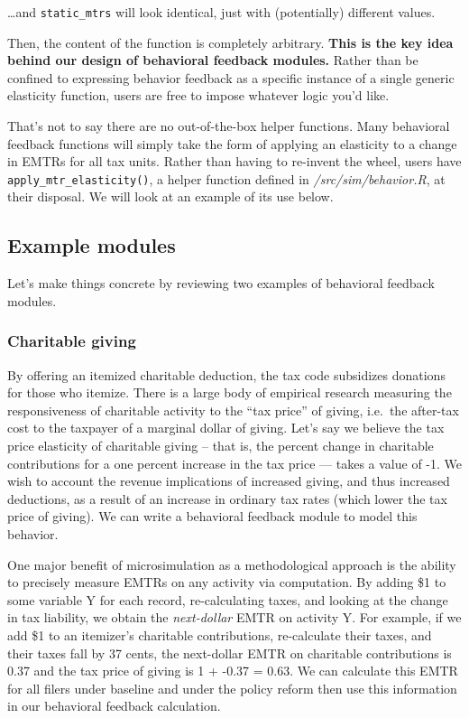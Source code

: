 \documentclass[
]{article}
\begin{document}
\ldots and \texttt{static\_mtrs} will look identical, just with
(potentially) different values.

Then, the content of the function is completely arbitrary. \textbf{This
is the key idea behind our design of behavioral feedback modules.}
Rather than be confined to expressing behavior feedback as a specific
instance of a single generic elasticity function, users are free to
impose whatever logic you'd like.

That's not to say there are no out-of-the-box helper functions. Many
behavioral feedback functions will simply take the form of applying an
elasticity to a change in EMTRs for all tax units. Rather than having to
re-invent the wheel, users have \texttt{apply\_mtr\_elasticity()}, a
helper function defined in \emph{/src/sim/behavior.R}, at their
disposal. We will look at an example of its use below.

\hypertarget{example-modules}{%
\subsection{Example modules}\label{example-modules}}

Let's make things concrete by reviewing two examples of behavioral
feedback modules.

\hypertarget{charitable-giving}{%
\subsubsection{Charitable giving}\label{charitable-giving}}

By offering an itemized charitable deduction, the tax code subsidizes
donations for those who itemize. There is a large body of empirical
research measuring the responsiveness of charitable activity to the
``tax price'' of giving, i.e.~the after-tax cost to the taxpayer of a
marginal dollar of giving. Let's say we believe the tax price elasticity
of charitable giving -- that is, the percent change in charitable
contributions for a one percent increase in the tax price --- takes a
value of -1. We wish to account the revenue implications of increased
giving, and thus increased deductions, as a result of an increase in
ordinary tax rates (which lower the tax price of giving). We can write a
behavioral feedback module to model this behavior.

One major benefit of microsimulation as a methodological approach is the
ability to precisely measure EMTRs on any activity via computation. By
adding \$1 to some variable Y for each record, re-calculating taxes, and
looking at the change in tax liability, we obtain the \emph{next-dollar}
EMTR on activity Y. For example, if we add \$1 to an itemizer's
charitable contributions, re-calculate their taxes, and their taxes fall
by 37 cents, the next-dollar EMTR on charitable contributions is 0.37
and the tax price of giving is 1 + -0.37 = 0.63. We can calculate this
EMTR for all filers under baseline and under the policy reform then use
this information in our behavioral feedback calculation.
\end{document}
